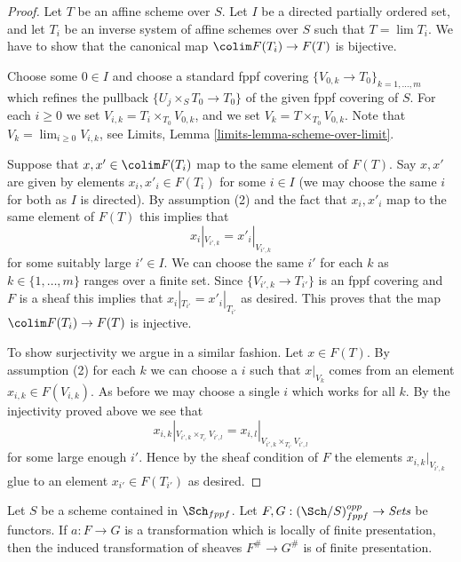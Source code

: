 \begin{proof}
Let $T$ be an affine scheme over $S$.
Let $I$ be a directed partially ordered set, and let
$T_i$ be an inverse system of affine schemes over $S$ such that
$T = \lim T_i$. We have to show that the canonical
map $\colim F(T_i) \to F(T)$ is bijective.

\medskip\noindent
Choose some $0 \in I$ and choose a standard fppf covering
$\{V_{0, k} \to T_{0}\}_{k = 1, \ldots, m}$ which refines
the pullback $\{U_j \times_S T_0 \to T_0\}$ of the given fppf covering of $S$.
For each $i \geq 0$ we set $V_{i, k} = T_i \times_{T_0} V_{0, k}$, and
we set $V_k = T \times_{T_0} V_{0, k}$. Note that
$V_k = \lim_{i \geq 0} V_{i, k}$, see
Limits, Lemma \ref{limits-lemma-scheme-over-limit}.

\medskip\noindent
Suppose that $x, x' \in \colim F(T_i)$ map to the same
element of $F(T)$. Say $x, x'$ are given by elements $x_i, x'_i \in F(T_i)$
for some $i \in I$ (we may choose the same $i$ for both as $I$ is directed).
By assumption (2) and the fact that $x_i, x'_i$ map to the same element
of $F(T)$ this implies that
$$
x_i|_{V_{i', k}} = x'_i|_{V_{i', k}}
$$
for some suitably large $i' \in I$. We can choose the same $i'$ for each
$k$ as $k \in \{1, \ldots, m\}$ ranges over a finite set.
Since $\{V_{i', k} \to T_{i'}\}$
is an fppf covering and $F$ is a sheaf this implies that
$x_i|_{T_{i'}} = x'_i|_{T_{i'}}$ as desired. This proves that the map
$\colim F(T_i) \to F(T)$ is injective.

\medskip\noindent
To show surjectivity we argue in a similar fashion.
Let $x \in F(T)$. By assumption (2) for each $k$ we
can choose a $i$ such that $x|_{V_k}$ comes from an
element $x_{i, k} \in F(V_{i, k})$. As before we may choose a
single $i$ which works for all $k$. By the injectivity
proved above we see that
$$
x_{i, k}|_{V_{i', k} \times_{T_{i'}} V_{i', l}}
=
x_{i, l}|_{V_{i', k} \times_{T_{i'}} V_{i', l}}
$$
for some large enough $i'$. Hence by the sheaf condition of $F$
the elements $x_{i, k}|_{V_{i', k}}$ glue to an element $x_{i'} \in F(T_{i'})$
as desired.
\end{proof}

\begin{lemma}
\label{lemma-sheafify-finite-presentation-map}
Let $S$ be a scheme contained in $\Sch_{fppf}$.
Let $F, G : (\Sch/S)_{fppf}^{opp} \to \textit{Sets}$ be functors.
If $a : F \to G$ is a transformation which is locally of finite
presentation, then the induced transformation of sheaves
$F^\# \to G^\#$ is of finite presentation.
\end{lemma}

